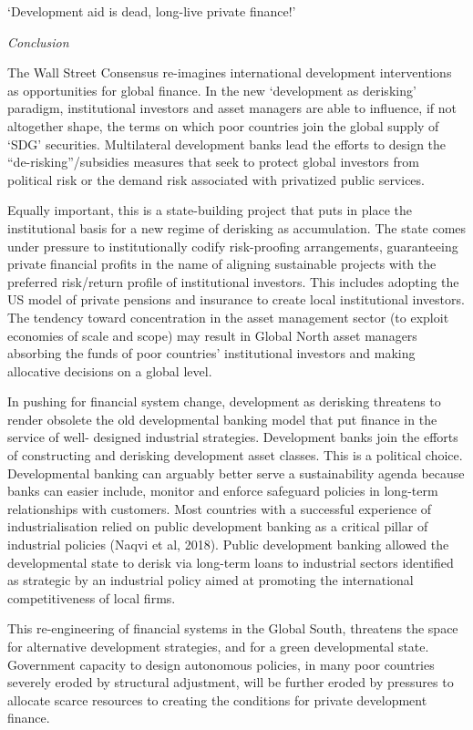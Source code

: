 \documentclass[
]{book}
\begin{document}
`Development aid is dead, long-live private finance!'

\emph{Conclusion}

The Wall Street Consensus re-imagines international development interventions as
opportunities for global finance. In the new `development as derisking' paradigm,
institutional investors and asset managers are able to influence, if not altogether shape,
the terms on which poor countries join the global supply of `SDG' securities.
Multilateral development banks lead the efforts to design the ``de-risking''/subsidies
measures that seek to protect global investors from political risk or the demand risk
associated with privatized public services.

Equally important, this is a state-building project that puts in place the institutional
basis for a new regime of derisking as accumulation. The state comes under pressure
to institutionally codify risk-proofing arrangements, guaranteeing private financial
profits in the name of aligning sustainable projects with the preferred risk/return profile
of institutional investors. This includes adopting the US model of private pensions and
insurance to create local institutional investors. The tendency toward concentration in
the asset management sector (to exploit economies of scale and scope) may result in
Global North asset managers absorbing the funds of poor countries' institutional
investors and making allocative decisions on a global level.

In pushing for financial system change, development as derisking threatens to render
obsolete the old developmental banking model that put finance in the service of well-
designed industrial strategies. Development banks join the efforts of constructing and
derisking development asset classes. This is a political choice. Developmental banking
can arguably better serve a sustainability agenda because banks can easier include,
monitor and enforce safeguard policies in long-term relationships with customers. Most
countries with a successful experience of industrialisation relied on public development
banking as a critical pillar of industrial policies (Naqvi et al, 2018). Public development
banking allowed the developmental state to derisk via long-term loans to industrial
sectors identified as strategic by an industrial policy aimed at promoting the
international competitiveness of local firms.

This re-engineering of financial systems in the Global South, threatens the space for
alternative development strategies, and for a green developmental state. Government
capacity to design autonomous policies, in many poor countries severely eroded by
structural adjustment, will be further eroded by pressures to allocate scarce resources
to creating the conditions for private development finance.
\end{document}
